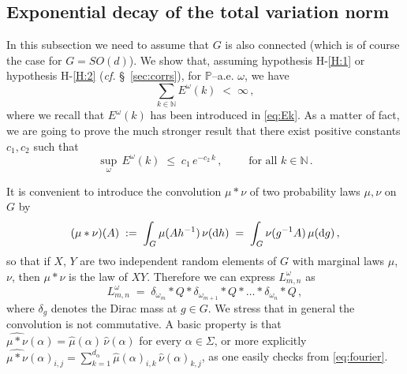 \documentclass[a4paper,reqno,11pt]{amsart}
\numberwithin{equation}{section}
\newcommand{\bbP}{{\ensuremath{\mathbb P}} }
\newcommand{\cB}{{\ensuremath{\mathcal B}} }
\newcommand{\ga}{\alpha}
\newcommand{\gd}{\delta}
\newcommand{\go}{\omega}
\newcommand{\dd}{\text{\rm d}}             %
\newcommand{\N}{\mathbb{N}}
\DeclareMathOperator{\tr}{Tr}
\newcommand{\somb}{\widehat} %
\begin{document}

\smallskip

\subsection{Exponential decay of the total variation norm}

In this subsection we need to assume that $G$ is also connected
(which is of course the case for $G=SO(d)$).
We show that, assuming hypothesis H-\ref{H:1} or  hypothesis H-\ref{H:2}
({\sl cf.} \S~\ref{sec:corrs}),
for $\bbP$--a.e. $\go$, we have
\begin{equation}
	\sum_{k \in \N} E^\go(k) \;<\; \infty\,,
\end{equation}
where we recall that $E^\go(k)$ has been introduced in \eqref{eq:Ek}.
As a matter of fact, we are going to prove the much stronger result
that there exist positive constants $c_1, c_2$ such that
\begin{equation} \label{eq:toprove}
	\sup_{\go} \, E^\go(k) \;\le\; c_1 \, e^{-c_2\, k}\,,
	\qquad \text{ for all } k \in \N \,.
\end{equation}

\smallskip

It is convenient to introduce the convolution $\mu*\nu$ of
two probability laws $\mu,\nu$ on $G$ by
\begin{equation}
	(\mu*\nu)(A) \;:=\; \int_G \mu(A h^{-1}) \, \nu(\dd h)
	\;=\; \int_G \nu(g^{-1}A) \, \mu(\dd g) \,,
\end{equation}
so that if $X$, $Y$ are two independent random elements of
$G$ with marginal laws $\mu$, $\nu$, then $\mu *\nu$ is the law of $XY$.
Therefore we can express $L^\go_{m,n}$ as
\begin{equation} \label{eq:multconv}
	L^\go_{m,n} \;=\; \gd_{\go_m} * Q * \gd_{\go_{m+1}} * Q * \ldots
	* \gd_{\go_n} * Q\,,
\end{equation}
where $\gd_{g}$ denotes the Dirac mass at $g \in G$.
We stress that in general the convolution is not commutative.
A basic property is that
$\widehat{\mu*\nu}(\ga) = \somb\mu(\ga) \, \somb\nu(\ga)$ for every $\ga \in \Sigma$,
or more explicitly $\widehat{\mu*\nu}(\ga)_{i,j} =
\sum_{k=1}^{d_\ga} \somb\mu(\ga)_{i,k} \, \somb\nu(\ga)_{k,j}$,
as one easily checks from \eqref{eq:fourier}.


\end{document}
